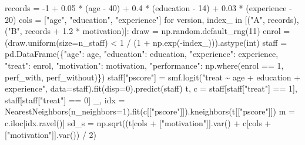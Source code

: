 \documentclass[
  letterpaper,
  10pt,
  twoside,
  openright,
  numbers=noenddot,
  chapterprefix=true]{scrbook}
\newenvironment{Shaded}{}{}
\newcommand{\BuiltInTok}[1]{\textcolor[rgb]{0.84,0.23,0.29}{#1}}
\newcommand{\ControlFlowTok}[1]{\textcolor[rgb]{0.84,0.23,0.29}{#1}}
\newcommand{\DecValTok}[1]{\textcolor[rgb]{0.00,0.36,0.77}{#1}}
\newcommand{\FloatTok}[1]{\textcolor[rgb]{0.00,0.36,0.77}{#1}}
\newcommand{\KeywordTok}[1]{\textcolor[rgb]{0.84,0.23,0.29}{#1}}
\newcommand{\NormalTok}[1]{\textcolor[rgb]{0.14,0.16,0.18}{#1}}
\newcommand{\OperatorTok}[1]{\textcolor[rgb]{0.14,0.16,0.18}{#1}}
\newcommand{\StringTok}[1]{\textcolor[rgb]{0.01,0.18,0.38}{#1}}
\begin{document}
\begin{Shaded}
\begin{Highlighting}[]
\NormalTok{records }\OperatorTok{=} \OperatorTok{{-}}\DecValTok{1} \OperatorTok{+} \FloatTok{0.05} \OperatorTok{*}\NormalTok{ (age }\OperatorTok{{-}} \DecValTok{40}\NormalTok{) }\OperatorTok{+} \FloatTok{0.4} \OperatorTok{*}\NormalTok{ (education }\OperatorTok{{-}} \DecValTok{14}\NormalTok{) }\OperatorTok{+} \FloatTok{0.03} \OperatorTok{*}\NormalTok{ (experience }\OperatorTok{{-}} \DecValTok{20}\NormalTok{)}
\NormalTok{cols }\OperatorTok{=}\NormalTok{ [}\StringTok{"age"}\NormalTok{, }\StringTok{"education"}\NormalTok{, }\StringTok{"experience"}\NormalTok{]}
\ControlFlowTok{for}\NormalTok{ version, index\_ }\KeywordTok{in}\NormalTok{ [(}\StringTok{"A"}\NormalTok{, records), (}\StringTok{"B"}\NormalTok{, records }\OperatorTok{+} \FloatTok{1.2} \OperatorTok{*}\NormalTok{ motivation)]:}
\NormalTok{    draw }\OperatorTok{=}\NormalTok{ np.random.default\_rng(}\DecValTok{11}\NormalTok{)}
\NormalTok{    enrol }\OperatorTok{=}\NormalTok{ (draw.uniform(size}\OperatorTok{=}\NormalTok{n\_staff) }\OperatorTok{\textless{}} \DecValTok{1} \OperatorTok{/}\NormalTok{ (}\DecValTok{1} \OperatorTok{+}\NormalTok{ np.exp(}\OperatorTok{{-}}\NormalTok{index\_))).astype(}\BuiltInTok{int}\NormalTok{)}
\NormalTok{    staff }\OperatorTok{=}\NormalTok{ pd.DataFrame(\{}\StringTok{"age"}\NormalTok{: age, }\StringTok{"education"}\NormalTok{: education, }\StringTok{"experience"}\NormalTok{: experience,}
                          \StringTok{"treat"}\NormalTok{: enrol, }\StringTok{"motivation"}\NormalTok{: motivation,}
                          \StringTok{"performance"}\NormalTok{: np.where(enrol }\OperatorTok{==} \DecValTok{1}\NormalTok{, perf\_with, perf\_without)\})}
\NormalTok{    staff[}\StringTok{"pscore"}\NormalTok{] }\OperatorTok{=}\NormalTok{ smf.logit(}\StringTok{"treat \textasciitilde{} age + education + experience"}\NormalTok{,}
\NormalTok{                                data}\OperatorTok{=}\NormalTok{staff).fit(disp}\OperatorTok{=}\DecValTok{0}\NormalTok{).predict(staff)}
\NormalTok{    t, c }\OperatorTok{=}\NormalTok{ staff[staff[}\StringTok{"treat"}\NormalTok{] }\OperatorTok{==} \DecValTok{1}\NormalTok{], staff[staff[}\StringTok{"treat"}\NormalTok{] }\OperatorTok{==} \DecValTok{0}\NormalTok{]}
\NormalTok{    \_, idx }\OperatorTok{=}\NormalTok{ NearestNeighbors(n\_neighbors}\OperatorTok{=}\DecValTok{1}\NormalTok{).fit(c[[}\StringTok{"pscore"}\NormalTok{]]).kneighbors(t[[}\StringTok{"pscore"}\NormalTok{]])}
\NormalTok{    m }\OperatorTok{=}\NormalTok{ c.iloc[idx.ravel()]}
\NormalTok{    sd\_s }\OperatorTok{=}\NormalTok{ np.sqrt((t[cols }\OperatorTok{+}\NormalTok{ [}\StringTok{"motivation"}\NormalTok{]].var() }\OperatorTok{+}\NormalTok{ c[cols }\OperatorTok{+}\NormalTok{ [}\StringTok{"motivation"}\NormalTok{]].var()) }\OperatorTok{/} \DecValTok{2}\NormalTok{)}

\end{Highlighting}
\end{Shaded}
\end{document}
